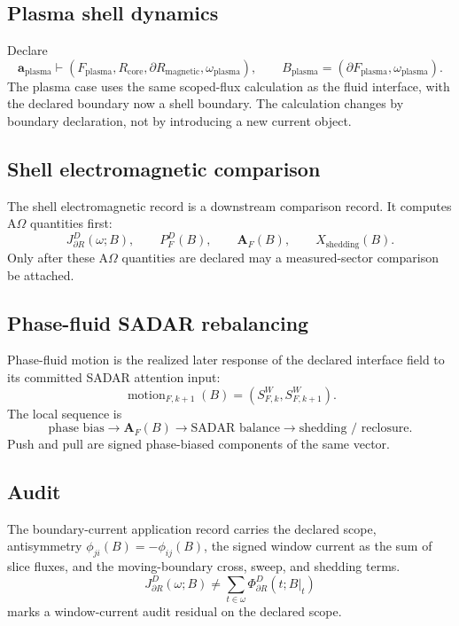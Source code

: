 \subsection{Plasma shell dynamics}\label{manual:boundary-current:plasma}
Declare
\[
\mathbf a_{\mathrm{plasma}}
\vdash
(F_{\mathrm{plasma}},R_{\mathrm{core}},\partial R_{\mathrm{magnetic}},\omega_{\mathrm{plasma}}),
\qquad
B_{\mathrm{plasma}}=(\partial F_{\mathrm{plasma}},\omega_{\mathrm{plasma}}).
\]
The plasma case uses the same scoped-flux calculation as the fluid interface, with the declared boundary now a shell boundary. The calculation changes by boundary declaration, not by introducing a new current object.

\subsection{Shell electromagnetic comparison}\label{manual:boundary-current:shell-em}
The shell electromagnetic record is a downstream comparison record. It computes A\(\Omega\) quantities first:
\[
J^D_{\partial R}(\omega;B),
\qquad
P^D_F(B),
\qquad
\mathbf A_F(B),
\qquad
X_{\mathrm{shedding}}(B).
\]
Only after these A\(\Omega\) quantities are declared may a measured-sector comparison be attached.

\subsection{Phase-fluid SADAR rebalancing}\label{manual:boundary-current:phase-fluid}
Phase-fluid motion is the realized later response of the declared interface
field to its committed SADAR attention input:
\[
\operatorname{motion}_{F,k+1}(B)=(S^W_{F,k},S^W_{F,k+1}).
\]
The local sequence is
\[
\text{phase bias}
\longrightarrow
\mathbf A_F(B)
\longrightarrow
\text{SADAR balance}
\longrightarrow
\text{shedding / reclosure}.
\]
Push and pull are signed phase-biased components of the same vector.

\subsection{Audit}\label{manual:boundary-current:falsification}
The boundary-current application record carries the declared scope, antisymmetry \(\phi_{ji}(B)=-\phi_{ij}(B)\), the signed window current as the sum of slice fluxes, and the moving-boundary cross, sweep, and shedding terms.
\[
J^D_{\partial R}(\omega;B)
\ne
\sum_{t\in\omega}\Phi^D_{\partial R}(t;B|_t)
\]
marks a window-current audit residual on the declared scope.

